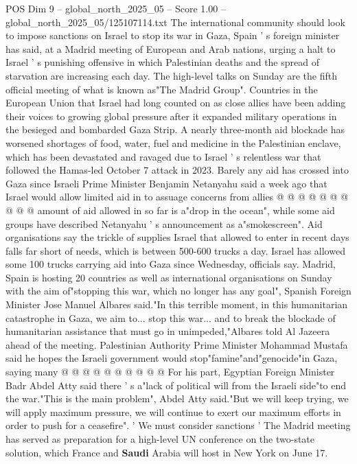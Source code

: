 \begin{textsample}{POS Dim 9 – global\_north\_2025\_05 – Score 1.00 – global\_north\_2025\_05/125107114.txt}  \label{ex:f9_pos_269}
The international community should look to impose sanctions on Israel to stop its war in Gaza, Spain ' s foreign minister has said, at a Madrid meeting of European and Arab nations, urging a halt to Israel ' s punishing offensive in which Palestinian deaths and the spread of starvation are increasing each day.
The high-level talks on Sunday are the fifth official meeting of what is known as"The Madrid Group".
Countries in the European Union that Israel had long counted on as close allies have been adding their voices to growing global pressure after it expanded military operations in the besieged and bombarded Gaza Strip.
A nearly three-month aid blockade has worsened shortages of food, water, fuel and medicine in the Palestinian enclave, which has been devastated and ravaged due to Israel ' s relentless war that followed the Hamas-led October 7 attack in 2023.
Barely any aid has crossed into Gaza since Israeli Prime Minister Benjamin Netanyahu said a week ago that Israel would allow limited aid in to assuage concerns from allies @ @ @ @ @ @ @ @ @ @ amount of aid allowed in so far is a"drop in the ocean", while some aid groups have described Netanyahu ' s announcement as a"smokescreen".
Aid organisations say the trickle of supplies Israel that allowed to enter in recent days falls far short of needs, which is between 500-600 trucks a day.
Israel has allowed some 100 trucks carrying aid into Gaza since Wednesday, officials say.
Madrid, Spain is hosting 20 countries as well as international organisations on Sunday with the aim of"stopping this war, which no longer has any goal", Spanish Foreign Minister Jose Manuel Albares said."In this terrible moment, in this humanitarian catastrophe in Gaza, we aim to... stop this war... and to break the blockade of humanitarian assistance that must go in unimpeded,"Albares told Al Jazeera ahead of the meeting.
Palestinian Authority Prime Minister Mohammad Mustafa said he hopes the Israeli government would stop"famine"and"genocide"in Gaza, saying many @ @ @ @ @ @ @ @ @ @ For his part, Egyptian Foreign Minister Badr Abdel Atty said there ' s a"lack of political will from the Israeli side"to end the war."This is the main problem", Abdel Atty said."But we will keep trying, we will apply maximum pressure, we will continue to exert our maximum efforts in order to push for a ceasefire". ' We must consider sanctions ' The Madrid meeting has served as preparation for a high-level UN conference on the two-state solution, which France and \textbf{Saudi} Arabia will host in New York on June 17.

\end{textsample}
